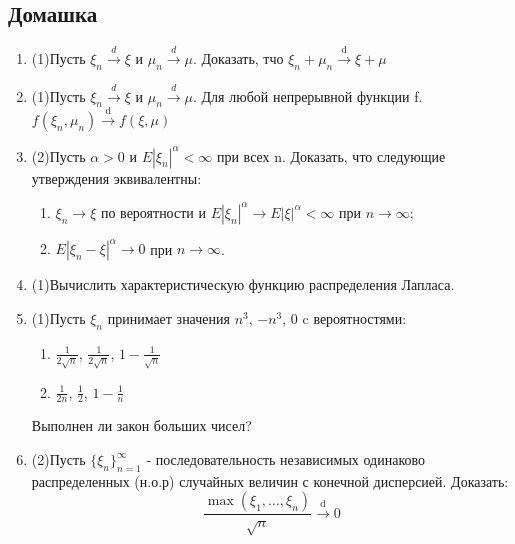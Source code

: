 \documentclass[a4paper, 14pt]{extarticle}
\begin{document}
\subsection*{Домашка}
\begin{enumerate}

\item (1)Пусть $\xi_n \overset{d}{\to} \xi$ и $\mu_n \overset{d}{\to} \mu$. Доказать, тчо
$ \xi_n + \mu_n \overset{\textrm{d}}{\to} \xi + \mu$

\item (1)Пусть $\xi_n \overset{d}{\to} \xi$ и $\mu_n \overset{d}{\to} \mu$. Для любой непрерывной функции f.
$f(\xi_n,\mu_n) \overset{\textrm{d}}{\to} f(\xi, \mu)$

\item (2)Пусть $\alpha > 0$ и $E|\xi_n|^\alpha < \infty$ при всех n. Доказать, что следующие
утверждения эквивалентны:
\begin{enumerate}
\item $\xi_n \to \xi$ по вероятности и $E|\xi_n|^\alpha \to E|\xi|^\alpha < \infty$ при $n \to \infty$;
\item $E|\xi_n - \xi|^\alpha \to 0$ при $n \to \infty$. 
\end{enumerate}

\item (1)Вычислить характеристическую функцию распределения Лапласа.

\item (1)Пусть $\xi_n$ принимает значения $n^3$, $-n^3$, 0 c вероятностями:
\begin{enumerate}
\item $\frac{1}{2\sqrt{n}}$, $\frac{1}{2\sqrt{n}}$, $1 - \frac{1}{\sqrt{n}}$
\item $\frac{1}{2n}$, $\frac{1}{2}$, $1 - \frac{1}{n}$
\end{enumerate} 
Выполнен ли закон больших чисел?

\item (2)Пусть $\{\xi_n\}_{n=1}^{\infty}$ - последовательность независимых одинаково распределенных (н.о.р) случайных величин
с конечной дисперсией. Доказать:
$$\frac{\max{(\xi_1, \ldots, \xi_n)}}{\sqrt{n}} \overset{\textrm{d}}{\to} 0$$




\end{enumerate}
\end{document}
